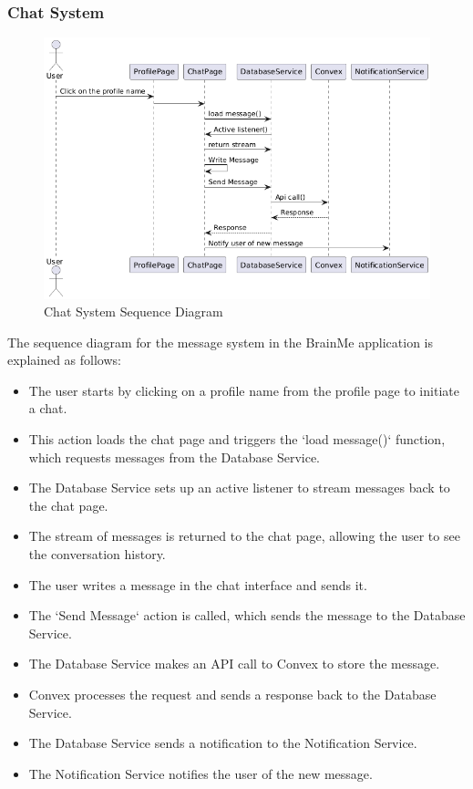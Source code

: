 \subsubsection{Chat System}

\begin{figure}[H]
    \flushleft
    \includegraphics[width=1\linewidth, height=0.4\textheight]{Sequence Diagrams/Chat System.png}
    \caption{Chat System Sequence Diagram}
\end{figure}
The sequence diagram for the message system in the BrainMe application is explained as follows:

\begin{itemize}
    \item The user starts by clicking on a profile name from the profile page to initiate a chat.
    \item This action loads the chat page and triggers the `load message()` function, which requests messages from the Database Service.
    \item The Database Service sets up an active listener to stream messages back to the chat page.
    \item The stream of messages is returned to the chat page, allowing the user to see the conversation history.
    \item The user writes a message in the chat interface and sends it.
    \item The `Send Message` action is called, which sends the message to the Database Service.
    \item The Database Service makes an API call to Convex to store the message.
    \item Convex processes the request and sends a response back to the Database Service.
    \item The Database Service sends a notification to the Notification Service.
    \item The Notification Service notifies the user of the new message.
\end{itemize}

